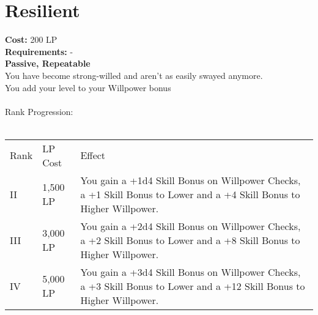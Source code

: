\section{Resilient}\label{perk:resilient}
\textbf{Cost:} 200 LP\\
\textbf{Requirements:} -\\
\textbf{Passive, Repeatable}\\
You have become strong-willed and aren't as easily swayed anymore.\\
You add your level to your Willpower bonus\\
\\
Rank Progression:\\
\\
\begin{longtable}{l | l | p{9cm}}
	Rank & LP Cost & Effect\\
	II & 1,500 LP & You gain a +1d4 Skill Bonus on Willpower Checks, a +1 Skill Bonus to Lower and a +4 Skill Bonus to Higher Willpower.\\
	III & 3,000 LP & You gain a +2d4 Skill Bonus on Willpower Checks, a +2 Skill Bonus to Lower and a +8 Skill Bonus to Higher Willpower.\\
	IV & 5,000 LP & You gain a +3d4 Skill Bonus on Willpower Checks, a +3 Skill Bonus to Lower and a +12 Skill Bonus to Higher Willpower.\\
\end{longtable}
